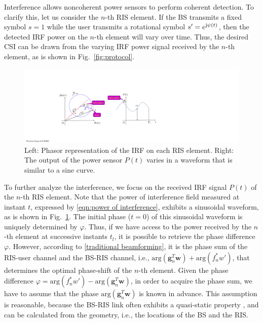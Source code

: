 \documentclass[conference,10pt,twocolumn]{IEEEtran}
\theoremstyle{nonumberplain}
\def \arg {\text{arg}}
\begin{document}
    Interference allows noncoherent power sensors to perform coherent detection. 
    To clarify this, let us consider the $n$-th RIS element. If the BS transmits a fixed symbol $s=1$ while the user transmits a rotational symbol $s'=e^{{\rm j}\psi(t)}$, then the detected IRF power on the $n$-th element will vary over time. 
    Thus, the desired CSI can be drawn from the varying IRF power signal received by the $n$-th element, as is shown in Fig.~\ref{fig:protocol}. 

    \begin{figure}[!t]
        \centering
        \includegraphics[width=.45\textwidth]{figures/phasor.pdf}
        \caption{Left: Phasor representation of the \ac{IRF} on each RIS element. Right: The output of the power sensor $P(t)$ varies in a waveform that is similar to a sine curve.}
        \label{fig:phasor}
    \end{figure}
    To further analyze the interference, we focus on the received IRF signal $P(t)$ of the $n$-th RIS element. 
    Note that the power of interference field measured at instant $t$, expressed by \eqref{eqn:power of interference}, exhibits a sinusoidal waveform, as is shown in Fig.~\ref{fig:phasor}. 
    The initial phase ($t=0$) of this sinusoidal waveform is uniquely determined by $\varphi$.
    Thus, if we have access to the power received by the $n$-th element at successive instants $t_l$, it is possible to retrieve the phase difference $\varphi$. 
    However, according to \eqref{traditional beamforming}, it is the phase sum of the RIS-user channel and the BS-RIS channel, i.e., $\arg({\bm g}_n^{T}{\bm w})+\arg(f_n^*w')$, that determines the optimal phase-shift of the $n$-th element. Given the phase difference $\varphi = \arg\left(f_{n}^{*}w'\right)-\arg\left(\bm g_{n}^{T}\bm w\right)$, in order to acquire the phase sum, we have to assume that the phase $\arg({\bm g}_n^{T}{\bm w})$ is known in advance. 
    This assumption is reasonable, because the BS-RIS link often exhibits a quasi-static property \cite{Huchen}, and can be calculated from the geometry, i.e., the locations of the BS and the RIS. 
\end{document}
